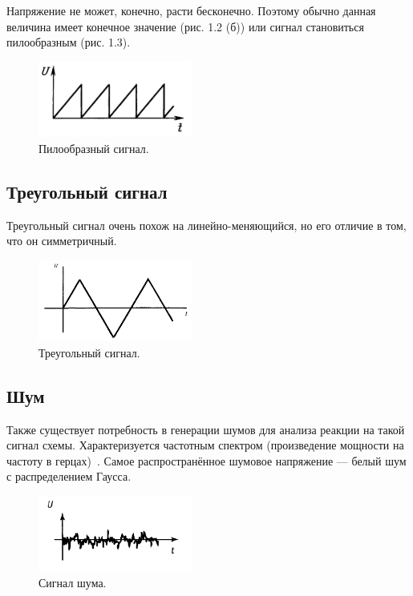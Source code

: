 	Напряжение не может, конечно, расти бесконечно. Поэтому обычно данная величина имеет конечное значение (рис. 1.2 (б)) или сигнал становиться пилообразным (рис. 1.3).

	\begin{figure}[H]
    \centering
    \includegraphics[width=0.45\textwidth]{../image/s_saw.png}
    \caption{Пилообразный сигнал.}
	\end{figure}

\subsection{Треугольный сигнал}
	Треугольный сигнал очень похож на линейно-меняющийся, но его отличие в том, что он симметричный.

	\begin{figure}[H]
    \centering
    \includegraphics[width=0.45\textwidth]{../image/s_tri.png}
    \caption{Треугольный сигнал.}
	\end{figure}

\subsection{Шум}
	
	Также существует потребность в генерации шумов для анализа реакции на такой сигнал схемы. Характеризуется частотным спектром (произведение мощности на частоту в герцах)~\cite{is1}. Самое распространённое шумовое напряжение --- белый шум с распределением Гаусса.  

	\begin{figure}[H]
    \centering
    \includegraphics[width=0.45\textwidth]{../image/s_noise.png}
    \caption{Сигнал шума.}
	\end{figure}

